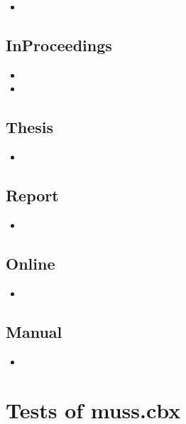 \begin{itemize}
\item {}
\end{itemize}

\subsection{InProceedings}

\begin{itemize}
\item {}
\item {}
\end{itemize}

\subsection{Thesis}

\begin{itemize}
\item {}
\end{itemize}

\subsection{Report}

\begin{itemize}
\item {}
\end{itemize}


\subsection{Online}

\begin{itemize}
\item {}
\end{itemize}

\subsection{Manual}

\begin{itemize}
\item {}
\end{itemize}

\newpage

\section{Tests of muss.cbx}

